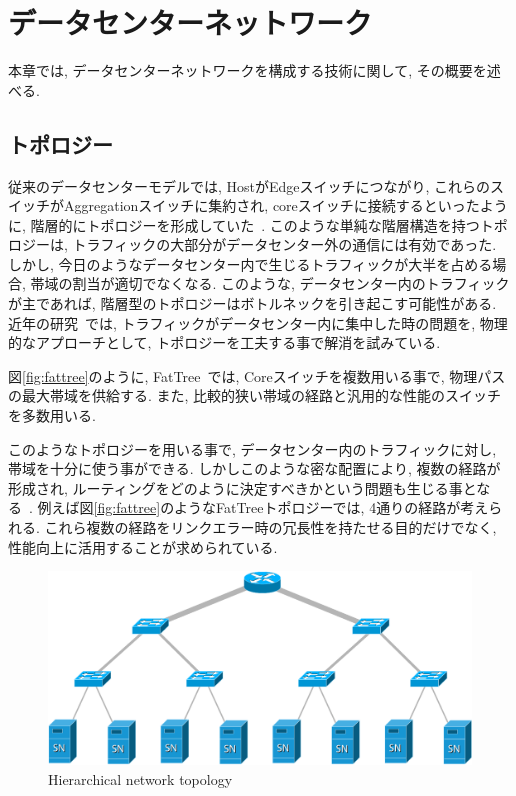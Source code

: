 \chapter{データセンターネットワーク}
\label{chapter:datacenter_network}
本章では, データセンターネットワークを構成する技術に関して, その概要を述べる.

\section{トポロジー}
従来のデータセンターモデルでは, HostがEdgeスイッチにつながり,
これらのスイッチがAggregationスイッチに集約され,
coreスイッチに接続するといったように, 階層的にトポロジーを形成していた~\cite{fattree}.
このような単純な階層構造を持つトポロジーは, トラフィックの大部分がデータセンター外の通信には有効であった.
しかし, 今日のようなデータセンター内で生じるトラフィックが大半を占める場合, 帯域の割当が適切でなくなる.
このような, データセンター内のトラフィックが主であれば, 階層型のトポロジーはボトルネックを引き起こす可能性がある.
近年の研究~\cite{fattree,bcube,vl2}では, トラフィックがデータセンター内に集中した時の問題を, 物理的なアプローチとして,
トポロジーを工夫する事で解消を試みている.

図\ref{fig:fattree}のように, FatTree~\cite{fattree}では, Coreスイッチを複数用いる事で,
物理パスの最大帯域を供給する.
また, 比較的狭い帯域の経路と汎用的な性能のスイッチを多数用いる.

このようなトポロジーを用いる事で, データセンター内のトラフィックに対し, 帯域を十分に使う事ができる.
しかしこのような密な配置により, 複数の経路が形成され, ルーティングをどのように決定すべきかという問題も生じる事となる~\cite{improving}.
例えば図\ref{fig:fattree}のようなFatTreeトポロジーでは, 4通りの経路が考えられる.
これら複数の経路をリンクエラー時の冗長性を持たせる目的だけでなく, 性能向上に活用することが求められている.

\begin{figure}[h]
    \begin{center}
    \includegraphics[autoebb, width=350pt]{./img/hierarchy_topology.pdf}
    \caption{Hierarchical network topology}
    \label{fig:hierarchical}
    \end{center}
\end{figure}

